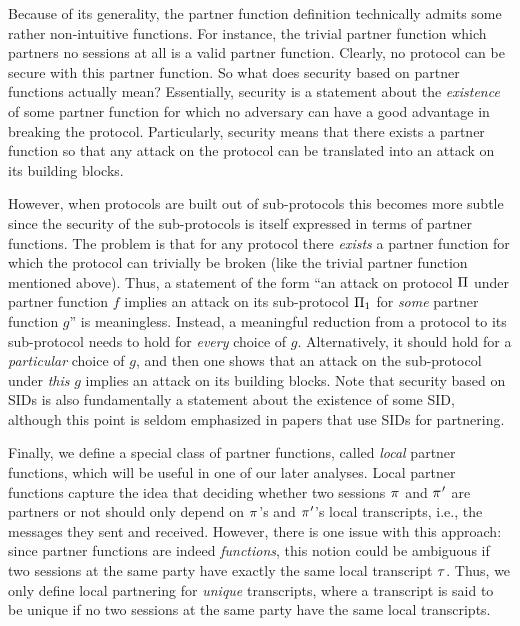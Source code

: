 Because of its generality,
the partner function definition technically admits some rather non-intuitive functions.
For instance,
the trivial partner function which partners no sessions at all is a valid partner function.
Clearly,
no protocol can be secure with this partner function.
So what does security based on partner functions actually mean?
Essentially,
security is a statement about the \emph{existence} of some partner function for which no adversary can have a good advantage in breaking the protocol.
Particularly, 
security means that there exists a partner function so that any attack on the protocol can be translated into an attack on its building blocks.

However,
when protocols are built out of sub-protocols this becomes more subtle since the security of the sub-protocols is itself expressed in terms of partner functions.
The problem is that for any protocol there \emph{exists} a partner function for which the protocol can trivially be broken
(like the trivial partner function mentioned above).
Thus,
a statement of the form ``an attack on protocol $\mathrm{\Pi}$ under partner function $f$ implies an attack on its sub-protocol $\mathrm{\Pi}_1$ for \emph{some} partner function $g$'' is meaningless. 
Instead,
a meaningful reduction from a protocol to its sub-protocol needs to hold for \emph{every} choice of $g$.
Alternatively,
it should hold for a \emph{particular} choice of $g$,
and then one shows that an attack on the sub-protocol under \emph{this} $g$ implies an attack on its building blocks.
Note that security based on SIDs is also fundamentally a statement about the existence of some SID,
although this point is seldom emphasized in papers that use SIDs for partnering.



Finally,
we define a special class of partner functions,
called \emph{local} partner functions,
which will be useful in one of our later analyses.
Local partner functions capture the idea that deciding whether two sessions $\oracle$ and $\oracle'$ are partners or not
should only depend on $\oracle$'s and $\oracle'$'s local transcripts,
i.e., the messages they sent and received. 
However,
there is one issue with this approach:
since partner functions are indeed \emph{functions},
this notion could be ambiguous if two sessions at the same party have exactly the same local transcript $\tau$. 
Thus,
we only define local partnering for \emph{unique} transcripts,
where a transcript is said to be unique if no two sessions at the same party have the same local transcripts.


